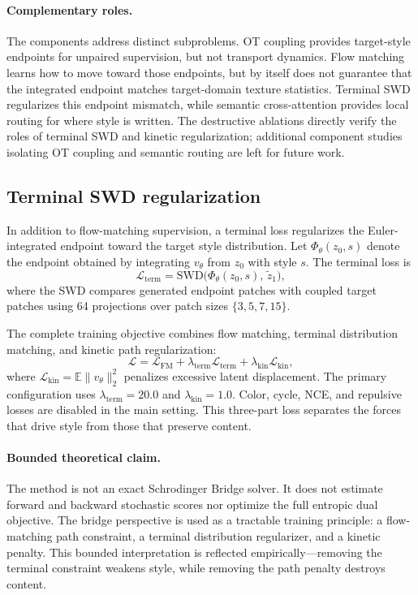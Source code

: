 ﻿\documentclass[letterpaper]{article}
\begin{document}
\paragraph{Complementary roles.}
The components address distinct subproblems. OT coupling provides target-style endpoints for unpaired supervision, but not transport dynamics. Flow matching learns how to move toward those endpoints, but by itself does not guarantee that the integrated endpoint matches target-domain texture statistics. Terminal SWD regularizes this endpoint mismatch, while semantic cross-attention provides local routing for where style is written. The destructive ablations directly verify the roles of terminal SWD and kinetic regularization; additional component studies isolating OT coupling and semantic routing are left for future work.

\subsection{Terminal SWD regularization}
In addition to flow-matching supervision, a terminal loss regularizes the Euler-integrated endpoint toward the target style distribution. Let $\Phi_\theta(z_0,s)$ denote the endpoint obtained by integrating $v_\theta$ from $z_0$ with style $s$. The terminal loss is
\begin{equation}
    \mathcal{L}_{\mathrm{term}} = \mathrm{SWD}\bigl(\Phi_\theta(z_0,s),\,\tilde{z}_1\bigr),
\end{equation}
where the SWD compares generated endpoint patches with coupled target patches using 64 projections over patch sizes $\{3,5,7,15\}$.

The complete training objective combines flow matching, terminal distribution matching, and kinetic path regularization:
\begin{equation}
    \mathcal{L} = \mathcal{L}_{\mathrm{FM}} + \lambda_{\mathrm{term}}\mathcal{L}_{\mathrm{term}} + \lambda_{\mathrm{kin}}\mathcal{L}_{\mathrm{kin}},
\end{equation}
where $\mathcal{L}_{\mathrm{kin}} = \mathbb{E}\|v_\theta\|_2^2$ penalizes excessive latent displacement. The primary configuration uses $\lambda_{\mathrm{term}}=20.0$ and $\lambda_{\mathrm{kin}}=1.0$. Color, cycle, NCE, and repulsive losses are disabled in the main setting. This three-part loss separates the forces that drive style from those that preserve content.

\paragraph{Bounded theoretical claim.}
The method is not an exact Schrodinger Bridge solver. It does not estimate forward and backward stochastic scores nor optimize the full entropic dual objective. The bridge perspective is used as a tractable training principle: a flow-matching path constraint, a terminal distribution regularizer, and a kinetic penalty. This bounded interpretation is reflected empirically---removing the terminal constraint weakens style, while removing the path penalty destroys content.
\end{document}
